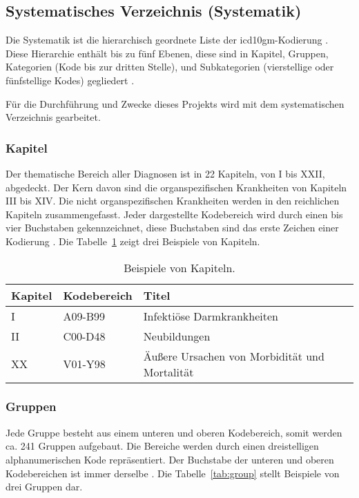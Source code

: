 \subsection{Systematisches Verzeichnis (Systematik)} \label{subsec:sistematic}

Die Systematik ist die hierarchisch geordnete Liste der \ac{icd10gm}-Kodierung \cite{icd10syst}. Diese Hierarchie enthält bis zu fünf Ebenen, diese sind in Kapitel, Gruppen, Kategorien (Kode bis zur dritten Stelle), und Subkategorien (vierstellige oder fünfstellige Kodes) gegliedert \cite{icd10systauf}.

Für die Durchführung und Zwecke dieses Projekts wird mit dem systematischen Verzeichnis gearbeitet.

\subsubsection{Kapitel} \label{subsubsec:chapters}

Der thematische Bereich aller Diagnosen ist in 22 Kapiteln, von I bis XXII, abgedeckt. Der Kern davon sind die organspezifischen Krankheiten von Kapiteln III bis XIV. Die nicht organspezifischen Krankheiten werden in den reichlichen Kapiteln zusammengefasst. Jeder dargestellte Kodebereich wird durch einen bis vier Buchstaben gekennzeichnet, diese Buchstaben sind das erste Zeichen einer Kodierung \cite{icd10systauf}. Die Tabelle~\ref{tab:chapter} zeigt drei Beispiele von Kapiteln.

\begin{table}[ht]
	\centering
	\small
	\caption{Beispiele von Kapiteln.}
	\label{tab:chapter}
	\begin{tabular}{|l|l|p{8cm}|}
		\hline
		\rowcolor{lightgray} Kapitel & Kodebereich & Titel \\
		\hline 
		I &  \textsf{A09-B99} & Infektiöse Darmkrankheiten \\ \hline
		II &  \textsf{C00-D48} & Neubildungen \\ \hline
		XX &  \textsf{V01-Y98} & Äußere Ursachen von Morbidität und Mortalität \\ \hline
	\end{tabular}
\end{table}

\subsubsection{Gruppen} \label{subsubsec:groups}

Jede Gruppe besteht aus einem unteren und oberen Kodebereich, somit werden ca. 241 Gruppen aufgebaut. Die Bereiche werden durch einen dreistelligen alphanumerischen Kode repräsentiert. Der Buchstabe der unteren und oberen Kodebereichen ist immer derselbe \cite{icd10systauf}. Die Tabelle~\ref{tab:group} stellt Beispiele von drei Gruppen dar.

